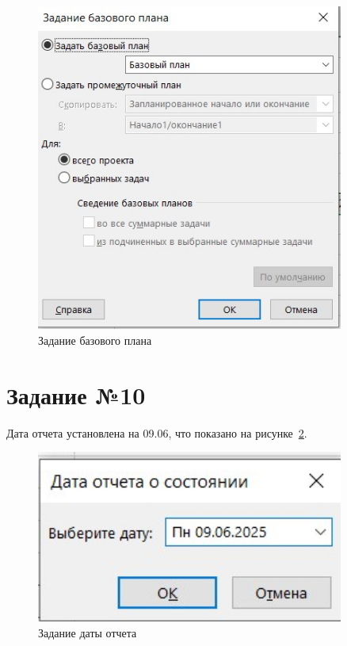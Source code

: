 \begin{figure}[H]
	\centering
	\includegraphics[width=0.9\textwidth]{img/task9/screen9_3.jpg}
	\caption{Задание базового плана}
	\label{fig:screen9_2}
\end{figure}

\section{Задание №10}

Дата отчета установлена на 09.06, что показано на рисунке~\ref{fig:screen10_1}.

\begin{figure}[H]
	\centering
	\includegraphics[width=0.9\textwidth]{img/task10/screen10_1.jpg}
	\caption{Задание даты отчета}
	\label{fig:screen10_1}
\end{figure}

